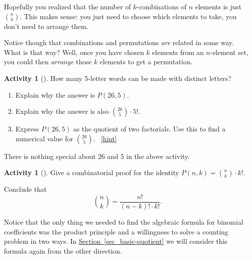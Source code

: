 \documentclass[10pt,]{book}
\theoremstyle{plain}
\theoremstyle{definition}
\theoremstyle{definition}
\theoremstyle{definition}
\newtheorem{activity}[project]{Activity}
\numberwithin{equation}{chapter}
\begin{document}
\hypertarget{p-667}{}%
Hopefully you realized that the number of \(k\)-combinations of \(n\) elements is just \(\binom{n}{k}\).  This makes sense: you just need to choose which elements to take, you don't need to arrange them.%
\par
\hypertarget{p-668}{}%
Notice though that combinations and permutations \emph{are} related in some way.  What is that way?  Well, once you have chosen \(k\) elements from an \(n\)-element set, you could then \emph{arrange} those \(k\) elements to get a permutation.%
\begin{activity}[]\label{activity-85}
\hypertarget{p-669}{}%
How many 5-letter words can be made with distinct letters?%
\begin{enumerate}[font=\bfseries,label=(\alph*),ref=\alph*]
\item\label{task-138} \hypertarget{p-670}{}%
Explain why the answer is \(P(26,5)\).%
\item\label{task-139} \hypertarget{p-671}{}%
Explain why the answer is also \(\binom{26}{5}\cdot 5!\).%
\item\label{task-140} \hypertarget{p-672}{}%
Express \(P(26,5)\) as the quotient of two factorials.  Use this to find a numerical value for \(\binom{26}{5}\).%
~\hfill{\tiny\hyperlink{a-92.c}{[hint]}\hypertarget{q-92.c}{}}\end{enumerate}
\end{activity}
\hypertarget{p-674}{}%
There is nothing special about 26 and 5 in the above activity.%
\begin{activity}[]\label{act-binomformula}
\hypertarget{p-675}{}%
Give a combinatorial proof for the identity \(P(n,k) = \binom{n}{k}\cdot k!\).%
\par
\hypertarget{p-676}{}%
Conclude that%
\begin{equation*}
\binom{n}{k} = \frac{n!}{(n-k)!\cdot k!}\text{.}
\end{equation*}
%
\end{activity}
\hypertarget{p-677}{}%
Notice that the only thing we needed to find the algebraic formula for binomial coefficients was the product principle and a willingness to solve a counting problem in two ways.  In \hyperref[sec_basic-quotient]{Section~\ref{sec_basic-quotient}} we will consider this formula again from the other direction.%
\typeout{************************************************}
\typeout{************************************************}
\end{document}
